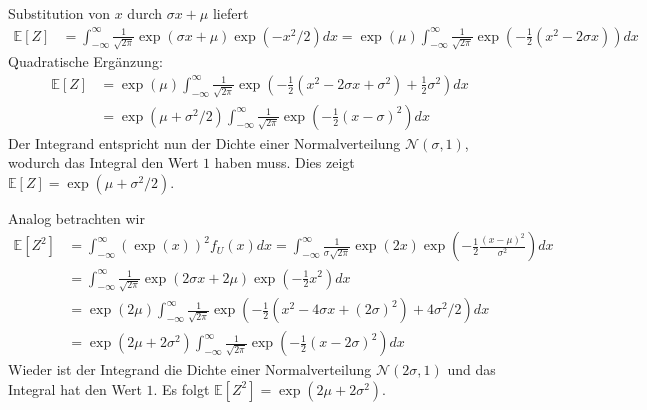 \documentclass{article}
\begin{document}
\begin{enumerate}[label=(\alph*)]
	      Substitution von $x$ durch $\sigma x + \mu$ liefert
	      \begin{align*}
		      \mathds{E}[Z] & = \int_{-\infty}^{\infty} \frac{1}{\sqrt{2 \pi}} \exp(\sigma x + \mu) \exp(-x^2/2) dx = \exp(\mu) \int_{-\infty}^{\infty} \frac{1}{\sqrt{2\pi}} \exp\left(-\frac{1}{2} (x^2 - 2 \sigma x )\right)dx
	      \end{align*}
	      Quadratische Ergänzung:
	      \begin{align*}
		      \mathds{E}[Z] & = \exp(\mu) \int_{-\infty}^{\infty} \frac{1}{\sqrt{2\pi}} \exp\left(-\frac{1}{2} (x^2 - 2 \sigma x + \sigma^2 ) + \frac{1}{2} \sigma^2\right)dx \\
		                    & = \exp(\mu + \sigma^2/2)  \int_{-\infty}^{\infty} \frac{1}{\sqrt{2\pi}} \exp\left(-\frac{1}{2} (x - \sigma)^2\right)dx
	      \end{align*}
	      Der Integrand entspricht nun der Dichte einer Normalverteilung $\mathcal{N}(\sigma, 1)$, wodurch das Integral den Wert $1$ haben muss. Dies zeigt $\mathds{E}[Z] = \exp(\mu + \sigma^2/2)$.

	      Analog betrachten wir
	      \begin{align*}
		      \mathds{E}[Z^2] & = \int_{-\infty}^{\infty} (\exp(x))^2 f_U(x) dx = \int_{-\infty}^{\infty} \frac{1}{\sigma \sqrt{2 \pi}} \exp(2x) \exp\left(- \frac{1}{2} \frac{(x - \mu)^2}{\sigma^2}\right) dx \\
		                      & = \int_{-\infty}^{\infty} \frac{1}{\sqrt{2 \pi}} \exp(2 \sigma x + 2 \mu) \exp\left(- \frac{1}{2} x^2\right) dx                                                                 \\
		                      & = \exp(2 \mu) \int_{-\infty}^{\infty} \frac{1}{\sqrt{2 \pi}}\exp\left(- \frac{1}{2} (x^2 - 4 \sigma x + (2 \sigma)^2) + 4 \sigma^2 / 2\right) dx                                \\
		                      & = \exp(2 \mu + 2 \sigma^2) \int_{-\infty}^{\infty} \frac{1}{\sqrt{2 \pi}}\exp\left(- \frac{1}{2} (x-2\sigma)^2\right) dx
	      \end{align*}
	      Wieder ist der Integrand die Dichte einer Normalverteilung $\mathcal{N}(2 \sigma, 1)$ und das Integral hat den Wert $1$. Es folgt $\mathds{E}[Z^2] = \exp(2 \mu + 2 \sigma^2)$.
\end{enumerate}

\subsection{}
\end{document}
